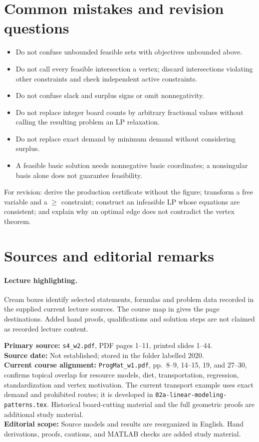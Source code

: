 \documentclass[11pt,a4paper]{article}
\begin{document}
\section{Common mistakes and revision questions}\label{sec:revision}
\begin{itemize}[leftmargin=1.6em]
  \item Do not confuse unbounded feasible sets with objectives unbounded above.
  \item Do not call every feasible intersection a vertex; discard intersections
        violating other constraints and check independent active constraints.
  \item Do not confuse slack and surplus signs or omit nonnegativity.
  \item Do not replace integer board counts by arbitrary fractional values without
        calling the resulting problem an LP relaxation.
  \item Do not replace exact demand by minimum demand without considering surplus.
  \item A feasible basic solution needs nonnegative basic coordinates; a nonsingular
        basis alone does not guarantee feasibility.
\end{itemize}
For revision: derive the production certificate without the figure; transform a
free variable and a $\geq$ constraint; construct an infeasible LP whose equations
are consistent; and explain why an optimal edge does not contradict the vertex theorem.

\clearpage
\section{Sources and editorial remarks}\label{sec:sources}
\paragraph{Lecture highlighting.}
Cream boxes identify selected statements, formulas and problem data recorded in
the supplied current lecture sources. The course map in
 gives the page destinations. Added hand proofs,
qualifications and solution steps are not claimed as recorded lecture content.

\noindent\textbf{Primary source:} \texttt{s4\_w2.pdf}, PDF pages 1--11,
printed slides 1--44.\\
\textbf{Source date:} Not established; stored in the folder labelled 2020.\\
\textbf{Current course alignment:} \texttt{ProgMat\_w1.pdf}, pp.~8--9,
14--15, 19, and 27--30, confirms topical overlap for resource models, diet,
transportation, regression, standardization and vertex motivation. The current
transport example uses exact demand and prohibited routes; it is developed in
\texttt{02a-linear-modeling-patterns.tex}. Historical board-cutting material
and the full geometric proofs are additional study material.\\
\textbf{Editorial scope:} Source models and results are reorganized in English.
Hand derivations, proofs, cautions, and MATLAB checks are added study material.
\end{document}
